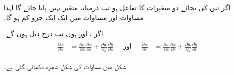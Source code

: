اگر  تین کی بجائے دو متغیرات کا تفاعل ہو تب درمیانہ متغیر  نہیں پایا جائے گا لہٰذا   مساوات  اور مساوات  میں ایک ایک جزو کم ہو گا۔

اگر ،  اور  ہوں تب درج ذیل ہوں گے۔
\begin{gather}
\begin{aligned}\label{مساوات_کثیرالمتغیر_دو_غیر_تابع_تین_درمیانے_متغیر_پ}
\frac{\partial w}{\partial s}&=\frac{\partial w}{\partial x}\frac{\partial x}{\partial s}+\frac{\partial w}{\partial y}\frac{\partial y}{\partial s}
\end{aligned}\quad\text{اور}\quad
\begin{aligned}
\frac{\partial w}{\partial r}&=\frac{\partial w}{\partial x}\frac{\partial x}{\partial r}+\frac{\partial w}{\partial y}\frac{\partial y}{\partial r}
\end{aligned}
\end{gather}

  شکل    میں  مساوات  کی  شکل شجرہ  دکھائی  گئی  ہے۔

